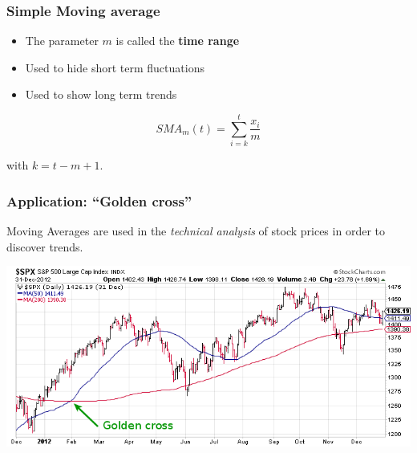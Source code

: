 \documentclass{beamer}
\begin{document}
\begin{frame}
  \frametitle{Simple Moving average}


  \begin{itemize}
    \item The parameter $m$ is called the \textbf{time range}
    \item Used to hide short term fluctuations
    \item Used to show long term trends
  \end{itemize}

  \begin{equation}
    SMA_m(t) = \sum_{i=k}^{t} \frac{x_{i}}{m}
    \label{eq:movingAverage}
  \end{equation}

  with $k = t - m + 1$.
\end{frame}

\begin{frame}
  \frametitle{Application: ``Golden cross''}

  Moving Averages are used in the \emph{technical analysis} of stock prices in order to discover trends.

  \begin{center}
    \includegraphics[width=\textwidth]{img/tijdreeks-golden-cross}
  \end{center}
\end{frame}
\end{document}
